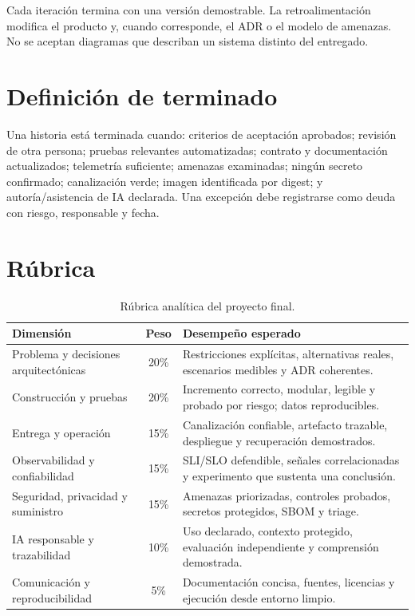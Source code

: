 Cada iteración termina con una versión demostrable. La retroalimentación modifica el producto y, cuando corresponde, el ADR o el modelo de amenazas. No se aceptan diagramas que describan un sistema distinto del entregado.

\section{Definición de terminado}

Una historia está terminada cuando: criterios de aceptación aprobados; revisión de otra persona; pruebas relevantes automatizadas; contrato y documentación actualizados; telemetría suficiente; amenazas examinadas; ningún secreto confirmado; canalización verde; imagen identificada por digest; y autoría/asistencia de IA declarada. Una excepción debe registrarse como deuda con riesgo, responsable y fecha.

\section{Rúbrica}

\begin{table}[htbp]
\centering
\caption{Rúbrica analítica del proyecto final.}
\small
\begin{tabularx}{\textwidth}{p{4cm}cX}
\toprule
\textbf{Dimensión} & \textbf{Peso} & \textbf{Desempeño esperado}\\
\midrule
Problema y decisiones arquitectónicas & 20\% & Restricciones explícitas, alternativas reales, escenarios medibles y ADR coherentes.\\
Construcción y pruebas & 20\% & Incremento correcto, modular, legible y probado por riesgo; datos reproducibles.\\
Entrega y operación & 15\% & Canalización confiable, artefacto trazable, despliegue y recuperación demostrados.\\
Observabilidad y confiabilidad & 15\% & SLI/SLO defendible, señales correlacionadas y experimento que sustenta una conclusión.\\
Seguridad, privacidad y suministro & 15\% & Amenazas priorizadas, controles probados, secretos protegidos, SBOM y triage.\\
IA responsable y trazabilidad & 10\% & Uso declarado, contexto protegido, evaluación independiente y comprensión demostrada.\\
Comunicación y reproducibilidad & 5\% & Documentación concisa, fuentes, licencias y ejecución desde entorno limpio.\\
\bottomrule
\end{tabularx}
\end{table}

